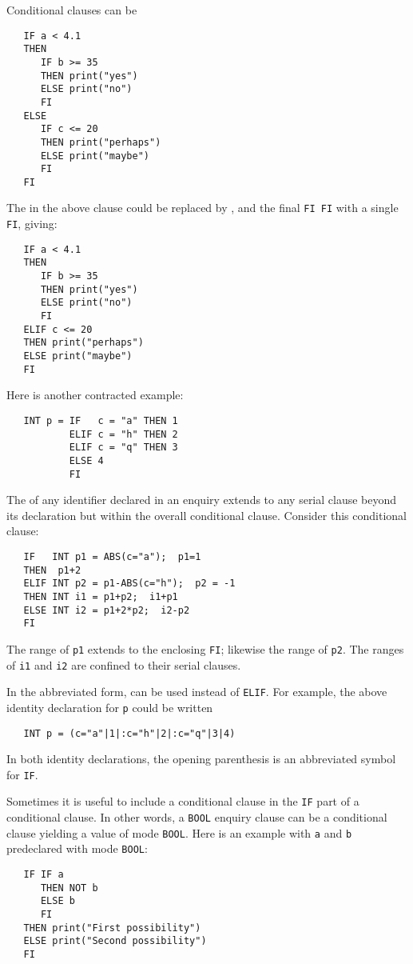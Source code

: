 Conditional clauses can be 
\begin{verbatim}
   IF a < 4.1
   THEN
      IF b >= 35
      THEN print("yes")
      ELSE print("no")
      FI
   ELSE
      IF c <= 20
      THEN print("perhaps")
      ELSE print("maybe")
      FI
   FI
\end{verbatim}
\noindent
The  in the above clause could be replaced by
, and the final \verb|FI FI| with a single \verb|FI|,
giving:
\begin{verbatim}
   IF a < 4.1
   THEN
      IF b >= 35
      THEN print("yes")
      ELSE print("no")
      FI
   ELIF c <= 20
   THEN print("perhaps")
   ELSE print("maybe")
   FI
\end{verbatim}
\noindent
Here is another contracted example:
\begin{verbatim}
   INT p = IF   c = "a" THEN 1
           ELIF c = "h" THEN 2
           ELIF c = "q" THEN 3
           ELSE 4
           FI
\end{verbatim}

The  of any identifier declared in an enquiry
 extends to any serial clause beyond
its declaration but within the overall conditional clause. Consider
this conditional clause:
\begin{verbatim}
   IF   INT p1 = ABS(c="a");  p1=1
   THEN  p1+2
   ELIF INT p2 = p1-ABS(c="h");  p2 = -1
   THEN INT i1 = p1+p2;  i1+p1
   ELSE INT i2 = p1+2*p2;  i2-p2
   FI
\end{verbatim}
\noindent
The range of \verb|p1| extends to the enclosing \verb|FI|; likewise
the range of \verb|p2|. The ranges of \verb|i1| and \verb|i2| are
confined to their serial clauses.

In the abbreviated form,  can be used
instead of \verb|ELIF|.  For example, the above identity declaration
for \verb|p| could be written
\begin{verbatim}
   INT p = (c="a"|1|:c="h"|2|:c="q"|3|4)
\end{verbatim}
\noindent
In both identity declarations, the opening parenthesis is an
abbreviated symbol for \verb|IF|.

Sometimes it is useful to include a conditional clause in the
\verb|IF| part of a conditional clause. In other words, a \verb|BOOL|
enquiry clause can be a conditional clause yielding a value of mode
\verb|BOOL|. Here is an example with \verb|a| and \verb|b|
predeclared with mode \verb|BOOL|:
\begin{verbatim}
   IF IF a
      THEN NOT b
      ELSE b
      FI
   THEN print("First possibility")
   ELSE print("Second possibility")
   FI
\end{verbatim}

